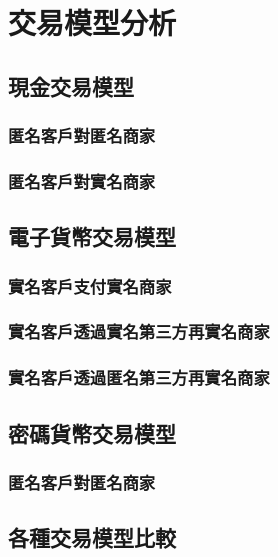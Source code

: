 
\chapter{交易模型分析}
	\section{現金交易模型}
		\subsection{匿名客戶對匿名商家}
		\subsection{匿名客戶對實名商家}
	\section{電子貨幣交易模型}
		\subsection{實名客戶支付實名商家}
		\subsection{實名客戶透過實名第三方再實名商家}
		\subsection{實名客戶透過匿名第三方再實名商家}
	\section{密碼貨幣交易模型}
		\subsection{匿名客戶對匿名商家}
	\section{各種交易模型比較}

